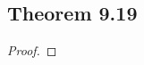 \documentclass[../../main.tex]{subfiles}
\begin{document}
\subsection{Theorem 9.19}
\begin{wts}

\end{wts}
\begin{proof}

\end{proof}
\end{document}

